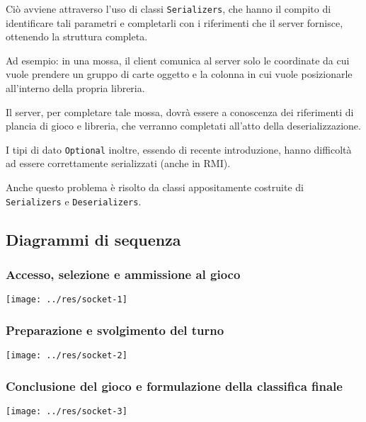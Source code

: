 \documentclass[a4paper,11pt]{article} %
\begin{document}
    Ciò avviene attraverso l'uso di classi \texttt{Serializers}, che hanno il compito di identificare tali parametri e completarli con i riferimenti
    che il server fornisce, ottenendo la struttura completa.

    Ad esempio: in una mossa, il client comunica al server solo le coordinate da cui vuole prendere un gruppo di carte oggetto e la colonna in cui vuole posizionarle
    all'interno della propria libreria.

    Il server, per completare tale mossa, dovrà essere a conoscenza dei riferimenti di plancia di gioco e libreria, che verranno completati all'atto della
    deserializzazione.

    \smallskip

    I tipi di dato \texttt{Optional} inoltre, essendo di recente introduzione, hanno difficoltà ad essere correttamente serializzati (anche in RMI).

    Anche questo problema è risolto da classi appositamente costruite di \texttt{Serializers} e \texttt{Deserializers}.

    \newpage

    \subsection{Diagrammi di sequenza}\label{subsec:diagrammi-di-sequenza}

    \subsubsection{Accesso, selezione e ammissione al gioco}

    \texttt{[image: ../res/socket-1]}

    \newpage

    \subsubsection{Preparazione e svolgimento del turno}

    \texttt{[image: ../res/socket-2]}

    \newpage

    \subsubsection{Conclusione del gioco e formulazione della classifica finale}

    \texttt{[image: ../res/socket-3]}
\end{document}

